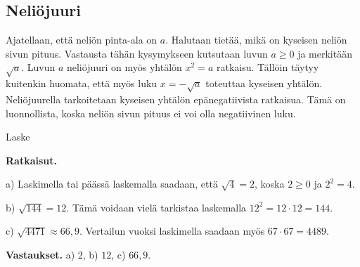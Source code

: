 \subsection*{Neliöjuuri}
\label{neliojuuri}

Ajatellaan, että neliön pinta-ala on $a$. Halutaan tietää, mikä on kyseisen neliön sivun pituus. Vastausta tähän kysymykseen kutsutaan luvun $a\ge 0$  ja merkitään $\sqrt{a}$. Luvun $a$ neliöjuuri on myös yhtälön $x^2 = a$ ratkaisu. Tällöin täytyy kuitenkin huomata, että myös luku $x=-\sqrt{a}$ toteuttaa kyseisen yhtälön. Neliöjuurella tarkoitetaan kyseisen yhtälön epänegatiivista ratkaisua. Tämä on luonnollista, koska neliön sivun pituus ei voi olla negatiivinen luku.





\begin{esimerkki}
Laske
\begin{alakohdat}


\end{alakohdat}

{\bf Ratkaisut.}

a)
Laskimella tai päässä laskemalla saadaan, että $\sqrt{4} = 2$, koska $2\geq0$ ja $2^2 =4$.

b) 
$\sqrt{144}=12$. Tämä voidaan vielä tarkistaa laskemalla $12^2 = 12\cdot 12=144$.

c)
$\sqrt{4471}\approx 66,9$. Vertailun vuoksi laskimella saadaan myös $67\cdot 67=4489$.

{\bf Vastaukset.}
a) $2$, b) $12$, c) $66,9$.

\end{esimerkki}

